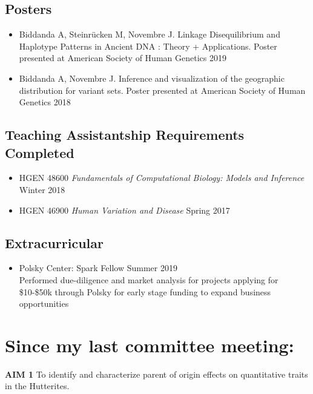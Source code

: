 \documentclass[a4paper, 11pt]{article}
\begin{document}
\subsection*{Posters}
\begin{itemize}
	 \item Biddanda A, Steinr\"{u}cken M, Novembre J. Linkage Disequilibrium and Haplotype Patterns in Ancient DNA : Theory + Applications. Poster presented at American Society of Human Genetics 2019
	 \item Biddanda A, Novembre J. Inference and visualization of the geographic distribution for variant sets. Poster presented at American Society of Human Genetics 2018 
\end{itemize}


\subsection*{Teaching Assistantship Requirements Completed}
\begin{itemize}
	\item HGEN 48600 \emph{Fundamentals of Computational Biology: Models and Inference} \hfill Winter 2018\\
	\item HGEN 46900 \emph{Human Variation and Disease} \hfill Spring 2017\\
\end{itemize}


\subsection*{Extracurricular}
\begin{itemize}
	\item  Polsky Center: Spark Fellow \hfill Summer 2019 \\
		Performed due-diligence and market analysis for projects applying for \$10-\$50k through Polsky for early stage funding to expand business opportunities  
\end{itemize}

\newpage

\section*{Since my last committee meeting:}

	\textbf{AIM 1} To identify and characterize parent of origin effects on quantitative traits in the Hutterites. \\
	
\end{document}
